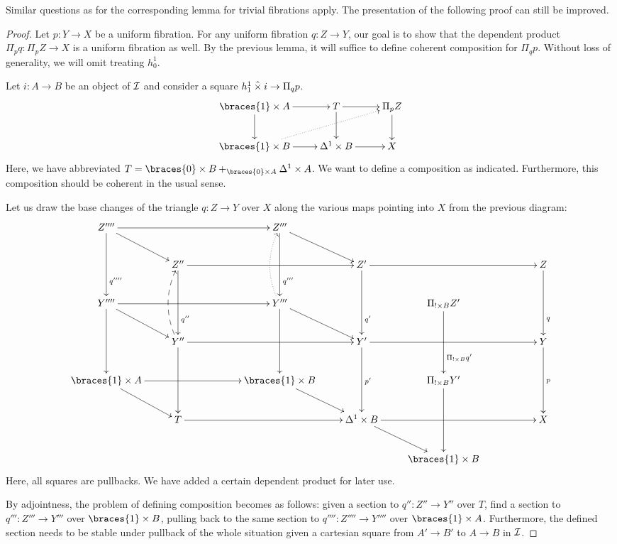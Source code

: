 \documentclass[reqno,10pt,a4paper,oneside]{amsart}
\begin{document}
\begin{question}
Similar questions as for the corresponding lemma for trivial fibrations apply.
The presentation of the following proof can still be improved.
\end{question}

\begin{proof}
Let $p : Y \to X$ be a uniform fibration.
For any uniform fibration $q : Z \to Y$, our goal is to show that the dependent product $\Pi_p q : \Pi_p Z \to X$ is a uniform fibration as well.
By the previous lemma, it will suffice to define coherent composition for $\Pi_q p$.
Without loss of generality, we will omit treating $h_0^1$.

Let $i : A \to B$ be an object of $\cal{I}$ and consider a square $h_1^1 \hattimes i \to \Pi_q p$.
\[
\xymatrix{
  \braces{1} \times A
  \ar[r]
  \ar[d]
&
  T
  \ar[r]
  \ar[d]
&
  \Pi_p Z
  \ar[d]
\\
  \braces{1} \times B
  \ar[r]
  \ar@{.>}[urr]
&
  \Delta^1 \times B
  \ar[r]
&
  X
}
\]
Here, we have abbreviated $T = \braces{0} \times B +_{\braces{0} \times A} \Delta^1 \times A$.
We want to define a composition as indicated.
Furthermore, this composition should be coherent in the usual sense.

Let us draw the base changes of the triangle $q : Z \to Y$ over $X$ along the various maps pointing into $X$ from the previous diagram:
\[
\xymatrix{
  Z''''
  \ar[rrr]
  \ar[dd]^(0.7){q''''}
  \ar[dr]
&&&
  Z'''
  \ar[dd]^(0.7){q'''}
  \ar[dr]
\\
&
  Z''
  \ar[rrr]
  \ar[dd]^(0.7){q''}
&&&
  Z'
  \ar[rrr]
  \ar[dd]^(0.7){q'}
&&&
  Z
  \ar[dd]^(0.7){q}
\\
  Y''''
  \ar[rrr]
  \ar[dd]
  \ar[dr]
&&&
  Y'''
  \ar[dd]
  \ar[dr]
  \ar@{.>}@/^1em/[uu]
&&
  \Pi_{\canonical \times B} Z'
  \ar[dd]^(0.7){\Pi_{\canonical \times B} q'}
\\&
  Y''
  \ar[rrr]
  \ar[dd]
  \ar@{-->}@/^1em/[uu]
&&&
  Y'
  \ar[rrr]
  \ar[dd]^{p'}
&&&
  Y
  \ar[dd]^{p}
\\
  \braces{1} \times A
  \ar[rrr]
  \ar[dr]
&&&
  \braces{1} \times B
  \ar[dr]
&&
  \Pi_{\canonical \times B} Y'
  \ar[dd]
\\&
  T
  \ar[rrr]
&&&
  \Delta^1 \times B
  \ar[rrr]
  \ar[dr]
&&&
  X
\\&&&&&
  \braces{1} \times B
}
\]
Here, all squares are pullbacks.
We have added a certain dependent product for later use.

By adjointness, the problem of defining composition becomes as follows: given a section to $q'' : Z'' \to Y''$ over $T$, find a section to $q''' : Z''' \to Y'''$ over $\braces{1} \times B$, pulling back to the same section to $q'''' : Z'''' \to Y''''$ over $\braces{1} \times A$.
Furthermore, the defined section needs to be stable under pullback of the whole situation given a cartesian square from $A' \to B'$ to $A \to B$ in $\cal{I}$.


\end{proof}
\end{document}
